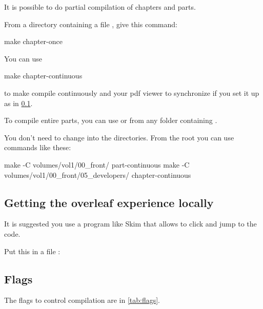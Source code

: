It is possible to do partial compilation of chapters and parts.

From a directory containing a file , give this command:
%
\begin{console}
	make chapter-once
\end{console}

You can use
%
\begin{console}
	make chapter-continuous
\end{console}
%
to make  compile continuously and your pdf viewer to synchronize if you set it up as in \cref{subsec:overleaf-experience}.

To compile entire parts, you can use  or  from any folder containing
.

You don't need to change into the directories.
From the root you can use commands like these:
%
\begin{console}
	make -C volumes/vol1/00_front/ part-continuous
	make -C volumes/vol1/00_front/05_developers/ chapter-continuous
\end{console}

\subsection{Getting the overleaf experience locally}
\label{subsec:overleaf-experience}

It is suggested you use a program like Skim that allows to click and jump to the code.

Put this in a file :
%

\subsection{Flags}

The flags to control compilation are in \cref{tab:flags}.


